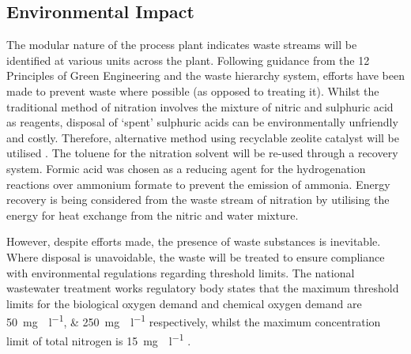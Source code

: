 

\subsection{Environmental Impact}

The modular nature of the process plant indicates waste streams will be identified at various units across the plant. Following guidance from the 12 Principles of Green Engineering and the waste hierarchy system, efforts have been made to prevent waste where possible (as opposed to treating it). Whilst the traditional method of nitration involves the mixture of nitric and sulphuric acid as reagents, disposal of ‘spent’ sulphuric acids can be environmentally unfriendly and costly. Therefore, alternative method using recyclable zeolite catalyst will be utilised \cite{smith_superior_1996}. The toluene for the nitration solvent will be re-used through a recovery system. Formic acid was chosen as a reducing agent for the hydrogenation reactions over ammonium formate to prevent the emission of  ammonia. Energy recovery is being considered from the waste stream of nitration by utilising the energy for heat exchange from the nitric and water mixture. 

However, despite efforts made, the presence of waste substances is inevitable. Where disposal is unavoidable, the waste will be treated to ensure compliance with environmental regulations regarding threshold limits. The national wastewater treatment works regulatory body states that the maximum threshold limits for the biological oxygen demand and chemical oxygen demand are \SIlist{50;250}{\mg{}\per\l} respectively, whilst the maximum concentration limit of total nitrogen is \SI{15}{\mg{}\per\l} \cite{noauthor_waste_nodate}.